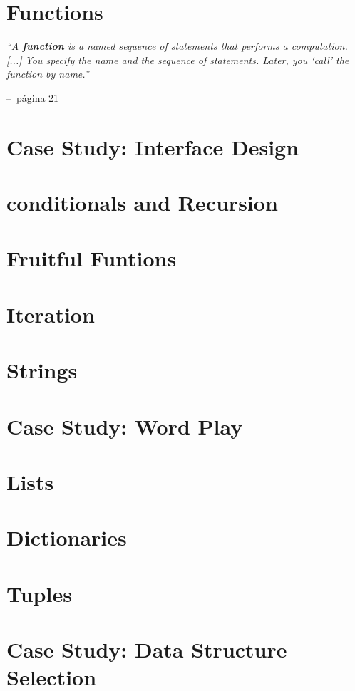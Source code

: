 \documentclass[a4paper,11pt]{book}
\makeatletter
\newenvironment{chapquote}[2][2em]
  {\setlength{\@tempdima}{#1}%
   \def\chapquote@author{#2}%
   \parshape 1 \@tempdima \dimexpr\textwidth-2\@tempdima\relax%
   \itshape}
  {\par\normalfont\hfill--\ \chapquote@author\hspace*{\@tempdima}\par\bigskip}
\makeatother
\begin{document}
\chapter{Functions}

\begin{chapquote}{página 21}
	``A \textbf{function} is a named sequence of statements that performs a computation. [...] You specify the name and the sequence of statements. Later, you `call' the function by name.''
\end{chapquote}



\chapter{Case Study: Interface Design}
\chapter{conditionals and Recursion}
\chapter{Fruitful Funtions}
\chapter{Iteration}
\chapter{Strings}
\chapter{Case Study: Word Play}
\chapter{Lists}
\chapter{Dictionaries}
\chapter{Tuples}
\chapter{Case Study: Data Structure Selection}
\end{document}
